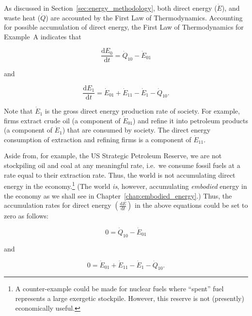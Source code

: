 As discussed in Section~\ref{sec:energy_methodology}, 
both direct energy ($\dot{E}$), and waste heat ($\dot{Q}$) 
are accounted by the First Law of Thermodynamics. 
Accounting for possible accumulation of direct energy, 
the First Law of Thermodynamics for Example~A indicates that

\begin{equation} \label{eq:dE_0/dt_single_sector}
	\frac{\mathrm{d}E_0}{\mathrm{d}t} 
	= \dot{Q}_{10} 
	- \dot{E}_{01}
\end{equation}

\noindent and

\begin{equation} \label{eq:dE_1/dt_single_sector}
	\frac{\mathrm{d}E_{1}}{\mathrm{d}t} 
	= \dot{E}_{01} 
	+ \dot{E}_{11}
	- \dot{E}_{1}
	- \dot{Q}_{10}.
\end{equation}

Note that $\dot{E}_{1}$ is the gross direct energy production rate
of society. 
For example, firms extract crude oil (a component of $\dot{E}_{01}$) 
and refine it into petroleum products (a component of $\dot{E}_{1}$)
that are consumed by society.
The direct energy consumption of extraction and refining firms 
is a component of $\dot{E}_{11}$.

Aside from, for example, the US 
Strategic Petroleum Reserve, 
we are not stockpiling oil and coal at any meaningful rate, 
i.e.\ we consume fossil fuels at a rate equal to their extraction rate. 
Thus, the world is not accumulating direct energy 
in the economy.\footnote{A counter-example could be made 
for nuclear fuels where ``spent'' fuel represents a large exergetic stockpile. 
However, this reserve is not (presently) economically useful.} 
(The world \emph{is}, however, 
accumulating \emph{embodied} energy 
in the economy as we shall see 
in Chapter~\ref{chap:embodied_energy}.) 
Thus, the accumulation rates for direct energy 
$\left( \frac{\mathrm{d}E}{\mathrm{d}t} \right)$ in the above equations 
could be set to zero as follows:

\begin{equation} \label{eq:biosphere_direct_energy_steady_state}
	0 
	= \dot{Q}_{10} 
	- \dot{E}_{01}
\end{equation}

\noindent and

\begin{equation} \label{eq:single_sector_direct_energy_steady_state}
	0 
	= \dot{E}_{01} 
	+ \dot{E}_{11}
	- \dot{E}_{1} 
	- \dot{Q}_{10}.
\end{equation}

